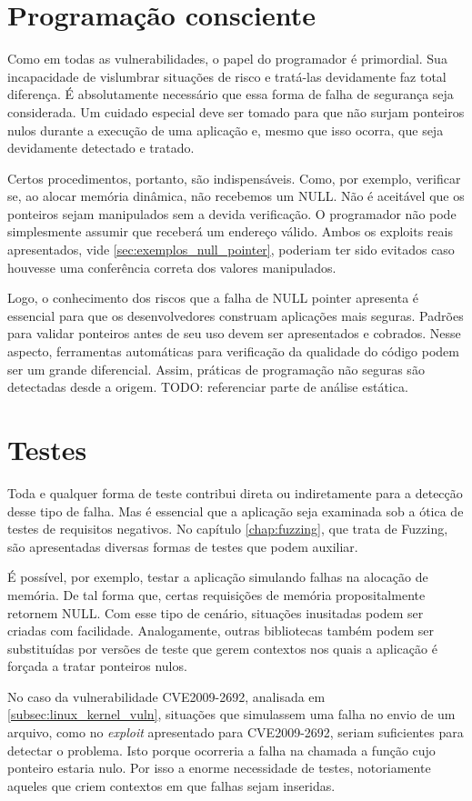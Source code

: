 		\section{Programação consciente}
			Como em todas as vulnerabilidades, o papel do programador é primordial.
			Sua incapacidade de vislumbrar situações de risco e tratá-las devidamente faz total diferença.
			É absolutamente necessário que essa forma de falha de segurança seja considerada.
			Um cuidado especial deve ser tomado para que não surjam ponteiros nulos
			durante a execução de uma aplicação e, mesmo que isso ocorra, que seja devidamente
			detectado e tratado.


			Certos procedimentos, portanto, são indispensáveis. Como, por exemplo, verificar se,
			ao alocar memória dinâmica, não recebemos um NULL. Não é aceitável que
			os ponteiros sejam manipulados sem a devida verificação. O programador não pode simplesmente
			assumir que receberá um endereço válido. Ambos os exploits reais apresentados, vide
			\ref{sec:exemplos_null_pointer}, poderiam ter sido evitados caso houvesse uma conferência correta
			dos valores manipulados.

			
			Logo, o conhecimento dos riscos que a falha de NULL pointer apresenta é essencial
			para que os desenvolvedores construam aplicações mais seguras.
			Padrões para validar ponteiros antes de seu uso devem ser apresentados e cobrados.
			Nesse aspecto, ferramentas automáticas para verificação da qualidade do código podem
			ser um grande diferencial. Assim, práticas de programação não seguras são
			detectadas desde a origem. TODO: referenciar parte de análise estática.

		\section{Testes}
			Toda e qualquer forma de teste contribui direta ou indiretamente para a detecção
			desse tipo de falha. Mas é essencial que a aplicação seja examinada sob
			a ótica de testes de requisitos negativos.
			No capítulo \ref{chap:fuzzing}, que trata de Fuzzing, são apresentadas
			diversas formas de testes que podem auxiliar.

			
			É possível, por exemplo, testar a aplicação simulando falhas na alocação de memória.
			De tal forma que, certas requisições de memória propositalmente retornem NULL.
			Com esse tipo de cenário, situações inusitadas podem ser criadas com facilidade.
			Analogamente, outras bibliotecas também podem ser substituídas por versões
			de teste que gerem contextos nos quais a aplicação é forçada a tratar ponteiros nulos.			


			No caso da vulnerabilidade CVE2009-2692, analisada em \ref{subsec:linux_kernel_vuln},
			situações que simulassem uma falha no envio de um arquivo, como no 
			\textsl{exploit} apresentado para CVE2009-2692, seriam suficientes para detectar o problema. 
			Isto porque ocorreria a falha na chamada a função cujo ponteiro estaria nulo.
			Por isso a enorme necessidade de testes, notoriamente aqueles que criem
			contextos em que falhas sejam inseridas.


